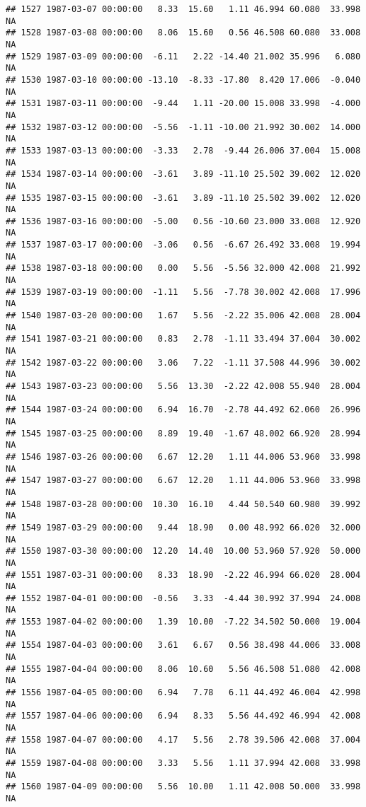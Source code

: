 \documentclass{article}\usepackage{graphicx, color}
\makeatletter
\newenvironment{kframe}{%
 \def\at@end@of@kframe{}%
 \ifinner\ifhmode%
  \def\at@end@of@kframe{\end{minipage}}%
  \begin{minipage}{\columnwidth}%
 \fi\fi%
 \def\FrameCommand##1{\hskip\@totalleftmargin \hskip-\fboxsep
 \colorbox{shadecolor}{##1}\hskip-\fboxsep
     \hskip-\linewidth \hskip-\@totalleftmargin \hskip\columnwidth}%
 \MakeFramed {\advance\hsize-\width
   \@totalleftmargin\z@ \linewidth\hsize
   \@setminipage}}%
 {\par\unskip\endMakeFramed%
 \at@end@of@kframe}
\newenvironment{knitrout}{}{} %
\makeatother
\begin{document}
\begin{knitrout}
\begin{kframe}
\begin{verbatim}
## 1527 1987-03-07 00:00:00   8.33  15.60   1.11 46.994 60.080  33.998     NA
## 1528 1987-03-08 00:00:00   8.06  15.60   0.56 46.508 60.080  33.008     NA
## 1529 1987-03-09 00:00:00  -6.11   2.22 -14.40 21.002 35.996   6.080     NA
## 1530 1987-03-10 00:00:00 -13.10  -8.33 -17.80  8.420 17.006  -0.040     NA
## 1531 1987-03-11 00:00:00  -9.44   1.11 -20.00 15.008 33.998  -4.000     NA
## 1532 1987-03-12 00:00:00  -5.56  -1.11 -10.00 21.992 30.002  14.000     NA
## 1533 1987-03-13 00:00:00  -3.33   2.78  -9.44 26.006 37.004  15.008     NA
## 1534 1987-03-14 00:00:00  -3.61   3.89 -11.10 25.502 39.002  12.020     NA
## 1535 1987-03-15 00:00:00  -3.61   3.89 -11.10 25.502 39.002  12.020     NA
## 1536 1987-03-16 00:00:00  -5.00   0.56 -10.60 23.000 33.008  12.920     NA
## 1537 1987-03-17 00:00:00  -3.06   0.56  -6.67 26.492 33.008  19.994     NA
## 1538 1987-03-18 00:00:00   0.00   5.56  -5.56 32.000 42.008  21.992     NA
## 1539 1987-03-19 00:00:00  -1.11   5.56  -7.78 30.002 42.008  17.996     NA
## 1540 1987-03-20 00:00:00   1.67   5.56  -2.22 35.006 42.008  28.004     NA
## 1541 1987-03-21 00:00:00   0.83   2.78  -1.11 33.494 37.004  30.002     NA
## 1542 1987-03-22 00:00:00   3.06   7.22  -1.11 37.508 44.996  30.002     NA
## 1543 1987-03-23 00:00:00   5.56  13.30  -2.22 42.008 55.940  28.004     NA
## 1544 1987-03-24 00:00:00   6.94  16.70  -2.78 44.492 62.060  26.996     NA
## 1545 1987-03-25 00:00:00   8.89  19.40  -1.67 48.002 66.920  28.994     NA
## 1546 1987-03-26 00:00:00   6.67  12.20   1.11 44.006 53.960  33.998     NA
## 1547 1987-03-27 00:00:00   6.67  12.20   1.11 44.006 53.960  33.998     NA
## 1548 1987-03-28 00:00:00  10.30  16.10   4.44 50.540 60.980  39.992     NA
## 1549 1987-03-29 00:00:00   9.44  18.90   0.00 48.992 66.020  32.000     NA
## 1550 1987-03-30 00:00:00  12.20  14.40  10.00 53.960 57.920  50.000     NA
## 1551 1987-03-31 00:00:00   8.33  18.90  -2.22 46.994 66.020  28.004     NA
## 1552 1987-04-01 00:00:00  -0.56   3.33  -4.44 30.992 37.994  24.008     NA
## 1553 1987-04-02 00:00:00   1.39  10.00  -7.22 34.502 50.000  19.004     NA
## 1554 1987-04-03 00:00:00   3.61   6.67   0.56 38.498 44.006  33.008     NA
## 1555 1987-04-04 00:00:00   8.06  10.60   5.56 46.508 51.080  42.008     NA
## 1556 1987-04-05 00:00:00   6.94   7.78   6.11 44.492 46.004  42.998     NA
## 1557 1987-04-06 00:00:00   6.94   8.33   5.56 44.492 46.994  42.008     NA
## 1558 1987-04-07 00:00:00   4.17   5.56   2.78 39.506 42.008  37.004     NA
## 1559 1987-04-08 00:00:00   3.33   5.56   1.11 37.994 42.008  33.998     NA
## 1560 1987-04-09 00:00:00   5.56  10.00   1.11 42.008 50.000  33.998     NA

\end{verbatim}
\end{kframe}
\end{knitrout}
\end{document}
